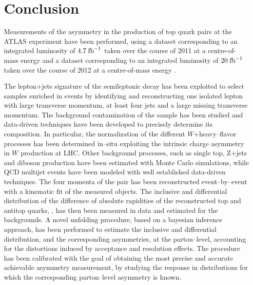 \chapter{Conclusion}
\label{sec:conclusion}

Measurements of the asymmetry in the production of top quark pairs at
the ATLAS experiment have been performed, using a dataset
corresponding to an integrated luminosity of $4.7 \; \mathrm{fb}^{-1}{}$ taken over
the course of 2011 at a centre-of-mass energy \seventev{} and a
dataset corresponding to an integrated luminosity of $20 \; \mathrm{fb}^{-1}{}$
taken over the course of 2012 at a centre-of-mass energy \eighttev{}.

The lepton+jets signature of the semileptonic \ttbar{} decay has been
exploited to select samples enriched in \ttbar{} events by identifying
and reconstructing one isolated lepton with large transverse momentum,
at least four jets and a large missing transverse momentum.
The background contamination of the sample has been studied and
data-driven techniques have been developed to precisely determine its
composition. In particular, the normalization of the different
$W$+heavy--flavor processes has been determined in--situ exploiting
the intrinsic charge asymmetry in $W$ production at LHC. 
Other background processes, such
as single top, Z+jets and diboson production have been estimated with
Monte Carlo simulations, while QCD multijet events have been modeled
with well established data-driven techniques.
The four momenta of the \ttbar{} pair has been reconstructed
event--by--event with a kinematic fit of the measured objects. The
inclusive and differential distribution of the difference of absolute
rapidities of the reconstructed top and antitop quarks, \dy{}, has then been
measured in data and estimated for the backgrounds.
A novel unfolding procedure, based on a bayesian inference approach, has
been performed to estimate the inclusive and differential \dy{}
distribution, and the corresponding asymmetries, at the parton--level,
accounting for the distortions induced by acceptance and
resolution effects.
The procedure has been calibrated with the goal of obtaining the most
precise and accurate achievable asymmetry measurement, by studying the
response in distributions for which the corresponding parton--level
asymmetry is known.


